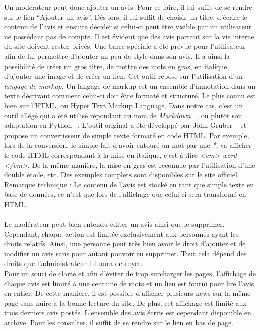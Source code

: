 \documentclass[12pt, a4paper, oneside]{article}
\begin{document}
    \indent Un modérateur peut donc ajouter un avis. Pour ce faire, il lui suffit de se rendre sur le lien ``Ajouter un avis''. Dès lors, il lui suffit de choisir un titre, d'écrire le contenu de l'avis et ensuite décider si celui-ci peut être visible par un utilisateur ne possédant pas de compte. Il est évident que des avis portant sur la vie interne du site doivent rester privés. Une barre spéciale a été prévue pour l'utilisateur afin de lui permettre d'ajouter un peu de style dans son avis. Il a ainsi la possibilité de créer un gros titre, de mettre des mots en gras, en italique, d'ajouter une image et de créer un lien. Cet outil repose sur l'utilisation d'un \textit{langage de markup}. Un langage de markup est un ensemble d'annotation dans un texte décrivant comment celui-ci doit être formaté et structuré. Le plus connu est bien sur l'HTML, ou Hyper Text Markup Language. Dans notre cas, c'est un outil allégé qui a été utilisé répondant au nom de \textit{Markdown} ~\cite{Markdown}, ou plutôt son adaptation en Python ~\cite{Markdow-python}. L'outil original a été développé par John Gruber ~\cite{john-gruber} et propose un convertisseur de simple texte formaté en code HTML. Par exemple, lors de la conversion, le simple fait d'avoir entouré un mot par une \textit{*}, va afficher le code HTML correspondant à la mise en italique, c'est à dire \textit{<em> word </em>}. De la même manière, la mise en gras est reconnue par l'utilisation d'une double étoile, etc. Des exemples complets sont disponibles sur le site officiel ~\cite{markdown-basics}. \\
    \underline{Remarque technique :} Le contenu de l'avis est stocké en tant que simple texte en base de données, ce n'est que lors de l'affichage que celui-ci sera transformé en HTML.\\\\
    \indent Le modérateur peut bien entendu éditer un avis ainsi que le supprimer. Cependant, chaque action est limitée exclusivement aux personnes ayant les droits relatifs. Ainsi, une personne peut très bien avoir le droit d'ajouter et de modifier un avis sans pour autant pouvoir en supprimer. Tout cela dépend des droits que l'administrateur lui aura octroyer.\\
    \indent Pour un souci de clarté et afin d'éviter de trop surcharger les pages, l'affichage de chaque avis est limité à une centaine de mots et un lien est fourni pour lire l'avis en entier. De cette manière, il est possible d'afficher plusieurs news sur la même page sans nuire à la bonne lecture du site. De plus, cet affichage est limité aux trois derniers avis postés. L'ensemble des avis écrits est cependant disponible en archive. Pour les consulter, il suffit de se rendre sur le lien en bas de page.
\end{document}
